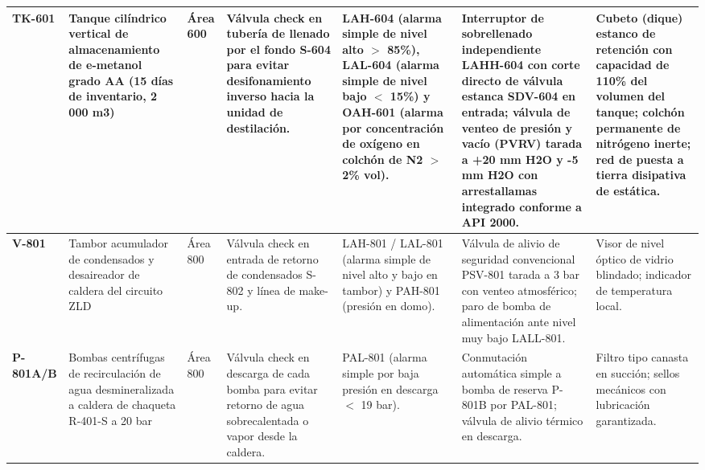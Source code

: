 \documentclass[10pt,letterpaper]{article}
\begin{document}
\begin{landscape}
\begin{xltabular}{\linewidth}{|l|p{2.8cm}|p{1.2cm}|>{\raggedright\arraybackslash}X|>{\raggedright\arraybackslash}X|>{\raggedright\arraybackslash}X|p{2.8cm}|}
\textbf{TK-601} & Tanque cilíndrico vertical de almacenamiento de e-metanol grado AA (15 días de inventario, 2 000 m3) & Área 600 & Válvula check en tubería de llenado por el fondo S-604 para evitar desifonamiento inverso hacia la unidad de destilación. & LAH-604 (alarma simple de nivel alto $>$ 85\%), LAL-604 (alarma simple de nivel bajo $<$ 15\%) y OAH-601 (alarma por concentración de oxígeno en colchón de N2 $>$ 2\% vol). & Interruptor de sobrellenado independiente LAHH-604 con corte directo de válvula estanca SDV-604 en entrada; válvula de venteo de presión y vacío (PVRV) tarada a +20 mm H2O y -5 mm H2O con arrestallamas integrado conforme a API 2000. & Cubeto (dique) estanco de retención con capacidad de 110\% del volumen del tanque; colchón permanente de nitrógeno inerte; red de puesta a tierra disipativa de estática. \\ \hline
\textbf{V-801} & Tambor acumulador de condensados y desaireador de caldera del circuito ZLD & Área 800 & Válvula check en entrada de retorno de condensados S-802 y línea de make-up. & LAH-801 / LAL-801 (alarma simple de nivel alto y bajo en tambor) y PAH-801 (presión en domo). & Válvula de alivio de seguridad convencional PSV-801 tarada a 3 bar con venteo atmosférico; paro de bomba de alimentación ante nivel muy bajo LALL-801. & Visor de nivel óptico de vidrio blindado; indicador de temperatura local. \\ \hline
\textbf{P-801A/B} & Bombas centrífugas de recirculación de agua desmineralizada a caldera de chaqueta R-401-S a 20 bar & Área 800 & Válvula check en descarga de cada bomba para evitar retorno de agua sobrecalentada o vapor desde la caldera. & PAL-801 (alarma simple por baja presión en descarga $<$ 19 bar). & Conmutación automática simple a bomba de reserva P-801B por PAL-801; válvula de alivio térmico en descarga. & Filtro tipo canasta en succión; sellos mecánicos con lubricación garantizada. \\ \hline
\end{xltabular}
\end{landscape}
\newpage
\end{document}
